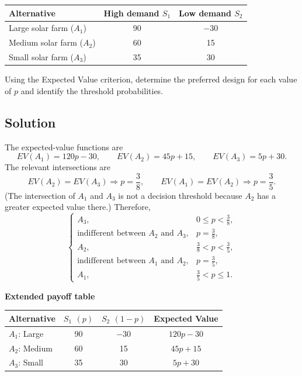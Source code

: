 	\begin{center}
		\renewcommand{\arraystretch}{1.3}
		\begin{tabular}{lcc}
			\toprule
			Alternative & High demand $S_1$ & Low demand $S_2$ \\
			\midrule
			Large solar farm ($A_1$) & 90 & $-30$ \\
			Medium solar farm ($A_2$) & 60 & 15 \\
			Small solar farm ($A_3$) & 35 & 30 \\
			\bottomrule
		\end{tabular}
	\end{center}

	Using the Expected Value criterion, determine the preferred design for
	each value of $p$ and identify the threshold probabilities.

	\subsection{Solution}

	The expected-value functions are
	\[
		EV(A_1)=120p-30,\qquad
		EV(A_2)=45p+15,\qquad
		EV(A_3)=5p+30.
	\]
	The relevant intersections are
	\[
		EV(A_2)=EV(A_3)\Rightarrow p=\frac{3}{8},
		\qquad
		EV(A_1)=EV(A_2)\Rightarrow p=\frac{3}{5}.
	\]
	(The intersection of $A_1$ and $A_3$ is not a decision threshold because
	$A_2$ has a greater expected value there.) Therefore,
	\[
		\boxed{
		\begin{cases}
			A_3, & 0\leq p<\frac{3}{8},\\
			\text{indifferent between }A_2\text{ and }A_3,
				& p=\frac{3}{8},\\
			A_2, & \frac{3}{8}<p<\frac{3}{5},\\
			\text{indifferent between }A_1\text{ and }A_2,
				& p=\frac{3}{5},\\
			A_1, & \frac{3}{5}<p\leq1.
		\end{cases}}
	\]

	\textbf{Extended payoff table}
	\begin{center}
		\renewcommand{\arraystretch}{1.4}
		\begin{tabular}{lccc}
			\toprule
			Alternative & $S_1$ $(p)$ & $S_2$ $(1-p)$ & Expected Value \\
			\midrule
			$A_1$: Large & 90 & $-30$ & $120p-30$ \\
			$A_2$: Medium & 60 & 15 & $45p+15$ \\
			$A_3$: Small & 35 & 30 & $5p+30$ \\
			\bottomrule
		\end{tabular}
	\end{center}

